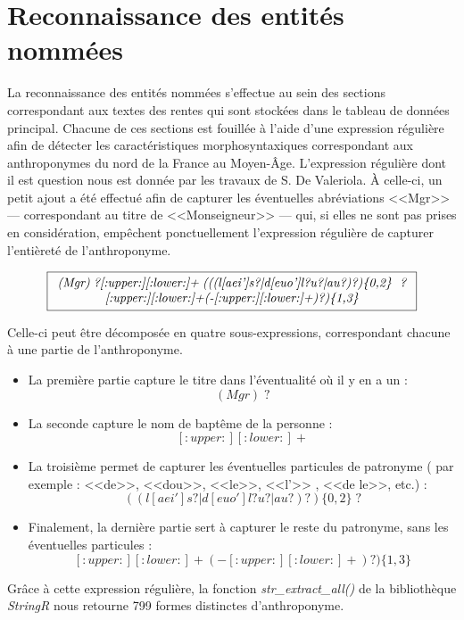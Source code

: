 
\section{Reconnaissance des entités nommées}
La reconnaissance des entités nommées s'effectue au sein des sections correspondant aux textes des rentes qui sont stockées dans le tableau de données principal. Chacune de ces sections est fouillée à l'aide d'une expression régulière afin de détecter les caractéristiques morphosyntaxiques correspondant aux anthroponymes du  nord  de la France au Moyen-Âge.
\newpage
L'expression régulière dont il est question nous est donnée par les travaux de S. De Valeriola. À celle-ci, un petit ajout a été effectué afin de capturer les éventuelles abréviations <<Mgr>>  ---  correspondant au titre de <<Monseigneur>> --- qui, si elles ne sont pas prises en considération, empêchent ponctuellement l'expression régulière de capturer l'entièreté de l'anthroponyme.

\[
    \boxed{
        \begin{array}{c}
        \textit{(Mgr)\;?[:upper:][:lower:]+\;(((l[aei']s?|d[euo']l?u?|au?)?)\{0,2\} \;?}\\
        \textit{[:upper:][:lower:]+(-[:upper:][:lower:]+)?)\{1,3\}}
        \end{array}
    }
\]

Celle-ci peut être décomposée en quatre sous-expressions, correspondant chacune à une partie de l'anthroponyme.
\begin{itemize}
    \item La première partie capture le titre  dans l'éventualité où il y en a un : \[(Mgr)\; ?\]
    \item La seconde capture le nom de baptême de la personne : \[[:upper:][:lower:]+\]
    \item La troisième permet de capturer les éventuelles particules de patronyme ( par exemple : <<de>>, <<dou>>, <<le>>, <<l'>> , <<de le>>, etc.) : \[ ((l[aei']s?|d[euo']l?u?|au?)?)\{0,2\}\;?\] 
    \item Finalement, la dernière partie sert à capturer le reste du patronyme, sans les éventuelles particules : \[[:upper:][:lower:]+(-[:upper:][:lower:]+)?)\{1,3\}\] 
\end{itemize}

Grâce à cette expression régulière, la fonction \textit{str\_extract\_all()} de la bibliothèque \textit{StringR} nous retourne 799 formes distinctes d'anthroponyme. 


